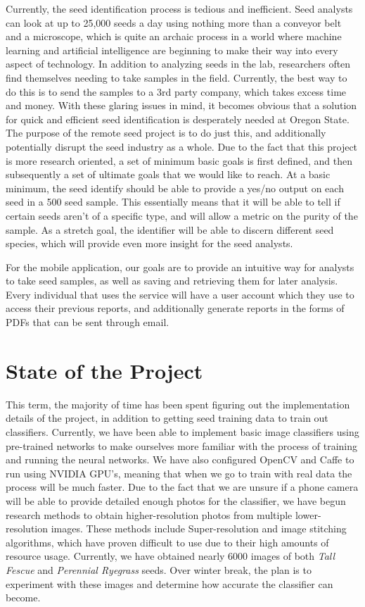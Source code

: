 \documentclass[onecolumn, draftclsnofoot,10pt, compsoc]{IEEEtran}
\begin{document}
Currently, the seed identification process is tedious and inefficient. Seed analysts can look at up to 25,000 seeds a day using nothing more than a conveyor belt and a microscope, which is quite an archaic process in a world where machine learning and artificial intelligence are beginning to make their way into every aspect of technology. In addition to analyzing seeds in the lab, researchers often find themselves needing to take samples in the field. Currently, the best way to do this is to send the samples to a 3rd party company, which takes excess time and money. With these glaring issues in mind, it becomes obvious that a solution for quick and efficient seed identification is desperately needed at Oregon State. The purpose of the remote seed project is to do just this, and additionally potentially disrupt the seed industry as a whole. Due to the fact that this project is more research oriented, a set of minimum basic goals is first defined, and then subsequently a set of ultimate goals that we would like to reach. At a basic minimum, the seed identify should be able to provide a yes/no output on each seed in a 500 seed sample. This essentially means that it will be able to tell if certain seeds aren't of a specific type, and will allow a metric on the purity of the sample. As a stretch goal, the identifier will be able to discern different seed species, which will provide even more insight for the seed analysts. 

For the mobile application, our goals are to provide an intuitive way for analysts to take seed samples, as well as saving and retrieving them for later analysis. Every individual that uses the service will have a user account which they use to access their previous reports, and additionally generate reports in the forms of PDFs that can be sent through email.

\section{State of the Project}

This term, the majority of time has been spent figuring out the implementation details of the project, in addition to getting seed training data to train out classifiers. Currently, we have been able to implement basic image classifiers using pre-trained networks to make ourselves more familiar with the process of training and running the neural networks. We have also configured OpenCV and Caffe to run using NVIDIA GPU's, meaning that when we go to train with real data the process will be much faster. Due to the fact that we are unsure if a phone camera will be able to provide detailed enough photos for the classifier, we have begun research methods to obtain higher-resolution photos from multiple lower-resolution images. These methods include Super-resolution and image stitching algorithms, which have proven difficult to use due to their high amounts of resource usage. Currently, we have obtained nearly 6000 images of both \textit{Tall Fescue} and \textit{Perennial Ryegrass} seeds. Over winter break, the plan is to experiment with these images and determine how accurate the classifier can become. 
\end{document}
